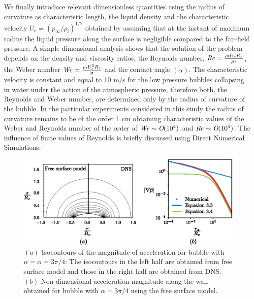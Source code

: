\documentclass[final]{jfm}
\begin{document}
We finally introduce relevant dimensionless quantities using the radius of curvature as characteristic length, the liquid density and the characteristic velocity $U_c= \left({p_\infty}/{\rho_l}\right)^{1/2}$ obtained by assuming that at the instant of maximum radius the liquid pressure along the surface is negligible compared to the far--field pressure. A simple dimensional analysis shows that the solution of the problem depends on the density and viscosity ratios, the Reynolds number, $\mbox{\textit{Re}} = \frac{\rho_l U_c R_c}{\mu_l}$, the Weber number $\mbox{\textit{We}} = \frac{\rho_l U_c^2 R_c}{\sigma}$ and the contact angle $(\alpha)$. 
The characteristic velocity is constant and equal to 10 m/s for the low pressure bubbles collapsing in water under the action of the atmospheric pressure, therefore both, the Reynolds and Weber number, are determined only by the radius of curvature of the bubble. 
In the particular experiments considered in this study the radius of curvature remains to be of the order 1 cm obtaining characteristic values of the Weber and Reynolds number of the order of $\mbox{\textit{We}} \sim \textit{O}(10^4)$ and $\mbox{\textit{Re}} \sim \textit{O}(10^5)$. The influence of finite values of Reynolds is briefly discussed using Direct Numerical Simulations.

\begin{figure}
\centering
\includegraphics[]{figsv2/Fig2.eps}
\caption{$(a)$ Isocontours of the magnitude of acceleration for bubble with $\alpha = \alpha=3\pi/4$: The isocontours in the left half are obtained from free surface model and those in the right half are obtained from DNS. $(b)$ Non-dimensional acceleration magnitude along the wall obtained for bubble with $\alpha=3\pi/4$ using the free surface model.}
\label{fig:contours}
\end{figure}
\end{document}
